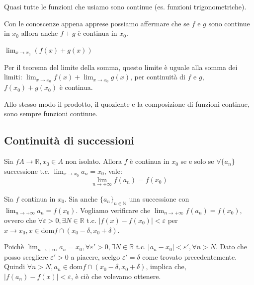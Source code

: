 \begin{osservation}
    Quasi tutte le funzioni che usiamo sono continue (es. funzioni trigonometriche).
\end{osservation}

Con le conoscenze appena apprese possiamo affermare che se $f$ e $g$ sono continue in $x_0$ allora anche $f+g$ è continua in $x_0$.
\begin{dimostration}
    $\lim_{x\to x_0}(f(x)+g(x))$
    
    Per il teorema del limite della somma, questo limite è uguale alla somma dei limiti: $\lim_{x\to x_0}f(x)+\lim_{x\to x_0}g(x)$, per continuità di $f$ e $g$, $f(x_0)+g(x_0)$ è continua.
\end{dimostration}

Allo stesso modo il prodotto, il quoziente e la composizione di funzioni continue, sono sempre funzioni continue.

\subsection*{Continuità di successioni}
Sia $f A\rightarrow\mathbb{R}, x_0\in A$ non isolato. Allora $f$ è continua in $x_0$ se e solo se $\forall\{a_n\}$ successione t.c. $\lim_{x\to x_0}a_n=x_0$, vale:
\begin{equation*}
    \lim_{n\to +\infty}f(a_n)=f(x_0)
\end{equation*}
\begin{dimostration}
    Sia $f$ continua in $x_0$. Sia anche $\{a_n\}_{n\in\mathbb{N}}$ una successione con $\lim_{n\to +\infty}a_n=f(x_0)$. Vogliamo verificare che $\lim_{n\to +\infty}f(a_n)=f(x_0)$, ovvero che $\forall\varepsilon>0, \exists N\in\mathbb{R}\text{ t.c. }|f(x)-f(x_0)|<\varepsilon$ per $x\to x_0, x\in\text{dom}f\cap (x_0-\delta,x_0+\delta)$.
    
    Poichè $\lim_{n\to +\infty}a_n=x_0, \forall\varepsilon'>0, \exists N\in\mathbb{R}\text{ t.c. }|a_n-x_0|<\varepsilon',\forall n>N$.
    Dato che posso scegliere $\varepsilon'>0$ a piacere, scelgo $\varepsilon'=\delta$ come trovato precedentemente. Quindi $\forall n>N, a_n\in\text{dom}f\cap(x_0-\delta,x_0+\delta)$, implica che, $|f(a_n)-f(x)|<\varepsilon$, è ciò che volevamo ottenere.
\end{dimostration}

